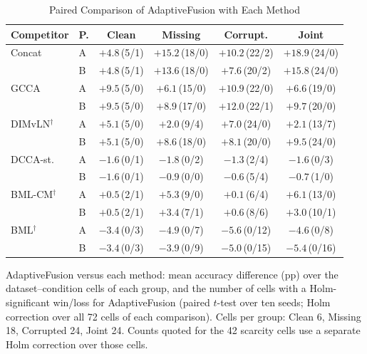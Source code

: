 \begin{table}[!t]
\caption{Paired Comparison of AdaptiveFusion with Each Method}
\label{tab:paired}
\centering
\footnotesize
\setlength{\tabcolsep}{2pt}
\begin{tabular}{llcccc}
\toprule
Competitor & P. & Clean & Missing & Corrupt. & Joint \\
\midrule
Concat & A & $+4.8$\,(5/1) & $+15.2$\,(18/0) & $+10.2$\,(22/2) & $+18.9$\,(24/0) \\
 & B & $+4.8$\,(5/1) & $+13.6$\,(18/0) & $+7.6$\,(20/2) & $+15.8$\,(24/0) \\
GCCA & A & $+9.5$\,(5/0) & $+6.1$\,(15/0) & $+10.9$\,(22/0) & $+6.6$\,(19/0) \\
 & B & $+9.5$\,(5/0) & $+8.9$\,(17/0) & $+12.0$\,(22/1) & $+9.7$\,(20/0) \\
DIMvLN$^\dagger$ & A & $+5.1$\,(5/0) & $+2.0$\,(9/4) & $+7.0$\,(24/0) & $+2.1$\,(13/7) \\
 & B & $+5.1$\,(5/0) & $+8.6$\,(18/0) & $+8.1$\,(20/0) & $+9.5$\,(24/0) \\
DCCA-st. & A & $-1.6$\,(0/1) & $-1.8$\,(0/2) & $-1.3$\,(2/4) & $-1.6$\,(0/3) \\
 & B & $-1.6$\,(0/1) & $-0.9$\,(0/0) & $-0.6$\,(5/4) & $-0.7$\,(1/0) \\
BML-CM$^\dagger$ & A & $+0.5$\,(2/1) & $+5.3$\,(9/0) & $+0.1$\,(6/4) & $+6.1$\,(13/0) \\
 & B & $+0.5$\,(2/1) & $+3.4$\,(7/1) & $+0.6$\,(8/6) & $+3.0$\,(10/1) \\
BML$^\dagger$ & A & $-3.4$\,(0/3) & $-4.9$\,(0/7) & $-5.6$\,(0/12) & $-4.6$\,(0/8) \\
 & B & $-3.4$\,(0/3) & $-3.9$\,(0/9) & $-5.0$\,(0/15) & $-5.4$\,(0/16) \\
\bottomrule
\end{tabular}
\par\smallskip
\parbox{\linewidth}{\scriptsize AdaptiveFusion versus each method: mean accuracy difference (pp) over the dataset--condition cells of each group, and the number of cells with a Holm-significant win/loss for AdaptiveFusion (paired $t$-test over ten seeds; Holm correction over all 72 cells of each comparison). Cells per group: Clean 6, Missing 18, Corrupted 24, Joint 24. Counts quoted for the 42 scarcity cells use a separate Holm correction over those cells.}
\end{table}
